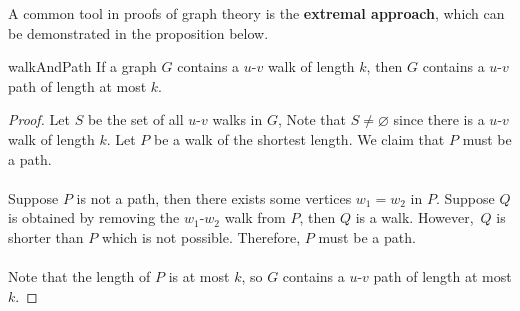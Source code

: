 \documentclass[math, code]{amznotes}
\theoremstyle{remark}
\begin{document}
A common tool in proofs of graph theory is the \textbf{extremal approach}, which can be demonstrated in the proposition below.
\begin{probox}{}{walkAndPath}
    If a graph $G$ contains a $u$-$v$ walk of length $k$, then $G$ contains a $u$-$v$ path of length at most $k$.
    \tcblower
    \begin{proof}
        Let $S$ be the set of all $u$-$v$ walks in $G$, Note that $S \neq \varnothing$ since there is a $u$-$v$ walk of length $k$. Let $P$ be a walk of the shortest length. We claim that $P$ must be a path.
        \\\\
        Suppose $P$ is not a path, then there exists some vertices $w_1 = w_2$ in $P$. Suppose $Q$ is obtained by removing the $w_1$-$w_2$ walk from $P$, then $Q$ is a walk. However,~$Q$ is shorter than $P$ which is not possible. Therefore, $P$ must be a path.
        \\\\
        Note that the length of $P$ is at most $k$, so $G$ contains a $u$-$v$ path of length at most $k$.
    \end{proof}
\end{probox}
\end{document}
